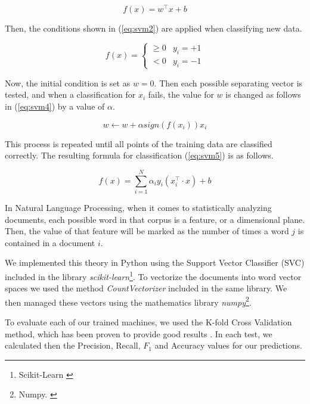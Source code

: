 \documentclass[review]{elsarticle}
\begin{document}
\begin{equation}\label{eq:svm1}
f(x) = w^\top x + b
\end{equation}

Then, the conditions shown in (\ref{eq:svm2}) are applied when classifying new data.

\begin{equation}\label{eq:svm2}
f(x) = 
  \begin{cases}
    \geq 0 & y_{i} = +1 \\
    < 0 & y_{i} = -1
  \end{cases}
\end{equation}

Now, the initial condition is set as \(w = 0\). Then each possible separating vector is tested, and when a classification for \(x_{i}\) fails, the value for \(w\) is changed as follows in (\ref{eq:svm4}) by a value of \(\alpha\).

\begin{equation}\label{eq:svm4}
w \leftarrow w + \alpha sign(f(x_i))x_i
\end{equation}

This process is repeated until all points of the training data are classified correctly. The resulting formula for classification (\ref{eq:svm5}) is as follows.

\begin{equation}\label{eq:svm5}
f(x) = \sum_{i=1}^N \alpha_i y_i (x_i^\top \cdot x) + b
\end{equation}

In Natural Language Processing, when it comes to statistically analyzing documents, each possible word in that corpus is a feature, or a dimensional plane. Then, the value of that feature will be marked as the number of times a word \(j\) is contained in a document \(i\).

We implemented this theory in Python using the Support Vector Classifier (SVC) included in the library \textit{scikit-learn}\footnote{\label{scikitlearn}Scikit-Learn \href {http://scikit-learn.org/}{}}. To vectorize the documents into word vector spaces we used the method \textit{CountVectorizer} included in the same library. We then managed these vectors using the mathematics library \textit{numpy}\footnote{\label{numpy}Numpy. \href {http://numpy.org/}{}}.

To evaluate each of our trained machines, we used the K-fold Cross Validation method, which has been proven to provide good results \cite[][]{kohavi1995}. In each test, we calculated then the Precision, Recall, \(F_{1}\) \cite[][]{powers2011} and Accuracy values for our predictions.
\end{document}
